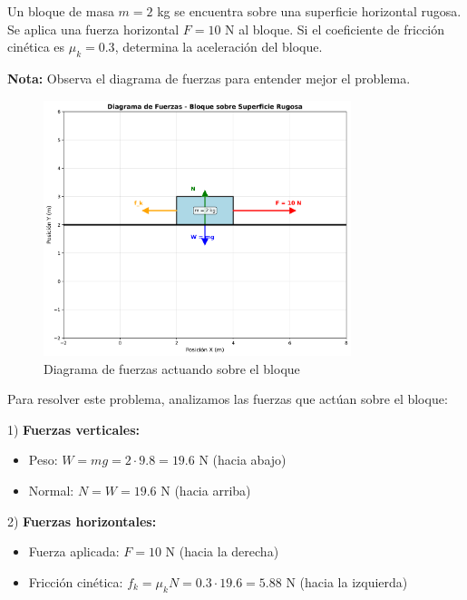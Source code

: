 \begin{ejercicio}[
  id=FISU_CIN_009,
  materia_principal=fisica_preuniversitaria,
  codigo_materia=FISU,
  capitulo=cinematica,
  subtema=movimiento,
  nivel=intermedio,
  procedencia="Examen CEPRE 2023",
  visibilidad=web_impreso,
  tiempo_estimado=5,
  libros={fisica_basica, fisica_mecanica},
  dificultad=2,
  tags={movimiento},
  youtube_url="https://www.youtube.com/watch?v=ejemplo_fisica",
  mostrar_solucion=true,
  libro_promocion=""
]
Un bloque de masa $m = 2$ kg se encuentra sobre una superficie horizontal rugosa. Se aplica una fuerza horizontal $F = 10$ N al bloque. Si el coeficiente de fricción cinética es $\mu_k = 0.3$, determina la aceleración del bloque.

\textbf{Nota:} Observa el diagrama de fuerzas para entender mejor el problema.

\begin{figure}[h]
\centering
\includegraphics[width=0.8\textwidth]{imagenes/diagrama_fuerzas_001.png}
\caption{Diagrama de fuerzas actuando sobre el bloque}
\label{fig:diagrama_fuerzas}
\end{figure}

\begin{solucion}
Para resolver este problema, analizamos las fuerzas que actúan sobre el bloque:

1) \textbf{Fuerzas verticales:}
   \begin{itemize}
   \item Peso: $W = mg = 2 \cdot 9.8 = 19.6$ N (hacia abajo)
   \item Normal: $N = W = 19.6$ N (hacia arriba)
   \end{itemize}

2) \textbf{Fuerzas horizontales:}
   \begin{itemize}
   \item Fuerza aplicada: $F = 10$ N (hacia la derecha)
   \item Fricción cinética: $f_k = \mu_k N = 0.3 \cdot 19.6 = 5.88$ N (hacia la izquierda)
   \end{itemize}


\end{solucion}
\end{ejercicio}
